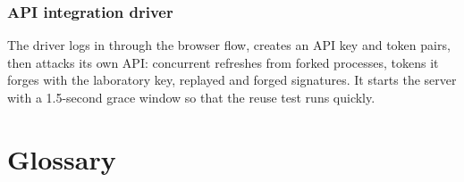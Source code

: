 \documentclass[11pt,openany]{book}
\begin{document}
\subsection{API integration driver}
The driver logs in through the browser flow, creates an API key and token pairs, then attacks its own API: concurrent refreshes from forked processes, tokens it forges with the laboratory key, replayed and forged signatures. It starts the server with a 1.5-second grace window so that the reuse test runs quickly.



\chapter{Glossary}\label{ch:glossary}
\end{document}

